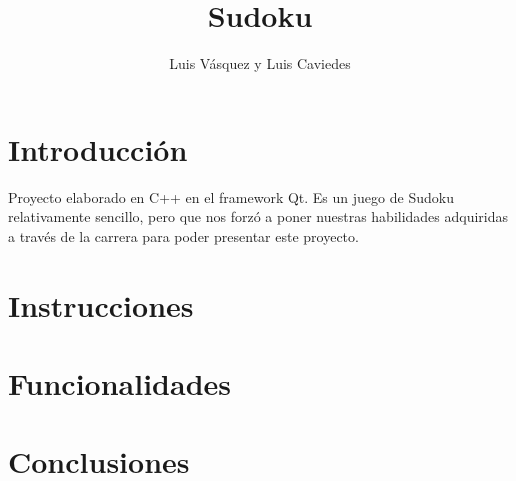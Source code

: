 \documentclass[12pt,oneside]{book}
\title{Sudoku}
\author{Luis Vásquez y Luis Caviedes}
\begin{document}
\maketitle
\tableofcontents
\chapter{Introducción}
Proyecto elaborado en C++ en el framework Qt. Es un juego de Sudoku relativamente sencillo, pero que nos forzó a poner nuestras habilidades adquiridas a través de la carrera para poder presentar este proyecto.
\chapter{Instrucciones}

\chapter{Funcionalidades}


\chapter{Conclusiones}

\end{document}
